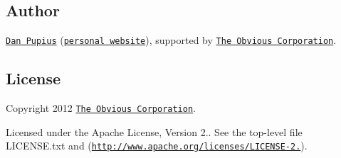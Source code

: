 \subsection*{Author }

\href{https://github.com/dpup}{\tt Dan Pupius} (\href{http://pupius.co.uk}{\tt personal website}), supported by \href{http://obvious.com/}{\tt The Obvious Corporation}.

\subsection*{License }

Copyright 2012 \href{http://obvious.com/}{\tt The Obvious Corporation}.

Licensed under the Apache License, Version 2.. See the top-\/level file {\ttfamily L\+I\+C\+E\+N\+S\+E.\+txt} and (\href{http://www.apache.org/licenses/LICENSE-2.0}{\tt http\+://www.\+apache.\+org/licenses/\+L\+I\+C\+E\+N\+S\+E-\/2.}). 